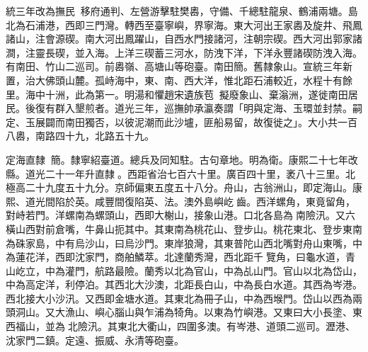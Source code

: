\begin{pinyinscope}
統三年改為撫民，移府通判、左營游擊駐樊嶴，守備、千總駐龍泉、鶴浦兩塘。島北為石浦港，西即三門灣。轉西至臺寧嶼，界寧海。東大河出王家嶴及旋井、飛鳳諸山，注會源碶。南大河出鳳躍山，自西水門接諸河，注朝宗碶。西大河出郭家諸澗，注靈長碶，並入海。上洋三碶蓄三河水，防洩下洋，下洋永豐諸碶防洩入海。有南田、竹山二巡司。前嶴嶺、高塘山等砲臺。南田簡。舊隸象山。宣統三年新置，治大佛頭山麓。孤峙海中，東、南、西大洋，惟北距石浦較近，水程十有餘里。海中十洲，此為第一。明湯和懼趙宋遺族苞，擬廢象山、棄滃洲，遂徙南田居民。後復有群入墾煎者。道光三年，巡撫帥承瀛奏謂「明與定海、玉環並封禁。嗣定、玉展闢而南田獨否，以彼泥潮而此沙壚，匪船易留，故復徙之」。大小共一百八嶴，南路四十九，北路五十九。

定海直隸：簡。隸寧紹臺道。總兵及同知駐。古句章地。明為衛。康熙二十七年改縣。道光二十一年升直隸。西距省治七百六十里。廣百四十里，袤八十三里。北極高二十九度五十九分。京師偏東五度五十八分。舟山，古翁洲山，即定海山。康熙、道光間陷於英。咸豐間復陷英、法。澳外島嶼屹齒。西洋螺角，東竟留角，對峙若門。洋螺南為螺頭山，西即大榭山，接象山港。口北各島為南險汛。又六橫山西對前倉嘴，牛鼻山扼其中。其東南為桃花山、登步山。桃花東北、登步東南為硃家島，中有烏沙山，曰烏沙門。東岸狼灣，其東普陀山西北嘴對舟山東嘴，中為蓮花洋，西即沈家門，商舶鱗萃。北達蘭秀灣，西北距千覽角，曰龜水道，青山屹立，中為灌門，航路最險。蘭秀以北為官山，中為乩山門。官山以北為岱山，中為高定洋，利停泊。其西北大沙澳，北距長白山，中為長白水道。其西為岑港。西北接大小沙汛。又西即金塘水道。其東北為冊子山，中為西堠門。岱山以西為兩頭洞山。又大漁山、嶼心腦山與乍浦為犄角。以東為竹嶼港。又東曰大小長塗、東西福山，並為北險汛。其東北大衢山，四圍多澳。有岑港、道頭二巡司。瀝港、沈家門二鎮。定遠、振威、永清等砲臺。


\end{pinyinscope}
